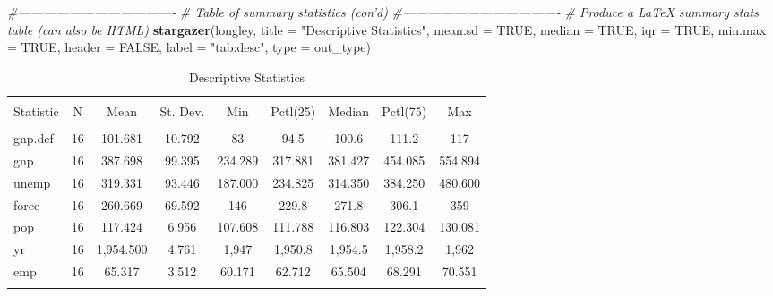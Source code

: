\documentclass[11pt,]{article}
\newenvironment{Shaded}{\begin{snugshade}}{\end{snugshade}}
\newcommand{\KeywordTok}[1]{\textcolor[rgb]{0.13,0.29,0.53}{\textbf{#1}}}
\newcommand{\DataTypeTok}[1]{\textcolor[rgb]{0.13,0.29,0.53}{#1}}
\newcommand{\StringTok}[1]{\textcolor[rgb]{0.31,0.60,0.02}{#1}}
\newcommand{\CommentTok}[1]{\textcolor[rgb]{0.56,0.35,0.01}{\textit{#1}}}
\newcommand{\OtherTok}[1]{\textcolor[rgb]{0.56,0.35,0.01}{#1}}
\newcommand{\NormalTok}[1]{#1}
\begin{document}
\begin{Shaded}
\begin{Highlighting}[]
\CommentTok{#-------------------------------------}
\CommentTok{# Table of summary statistics (con'd)}
\CommentTok{#-------------------------------------}
  \CommentTok{# Produce a LaTeX summary stats table (can also be HTML)}
  \KeywordTok{stargazer}\NormalTok{(longley, }
            \DataTypeTok{title =} \StringTok{"Descriptive Statistics"}\NormalTok{,}
      \DataTypeTok{mean.sd =} \OtherTok{TRUE}\NormalTok{, }\DataTypeTok{median =} \OtherTok{TRUE}\NormalTok{, }\DataTypeTok{iqr =} \OtherTok{TRUE}\NormalTok{, }\DataTypeTok{min.max =} \OtherTok{TRUE}\NormalTok{,}
      \DataTypeTok{header =} \OtherTok{FALSE}\NormalTok{, }\DataTypeTok{label =} \StringTok{"tab:desc"}\NormalTok{, }\DataTypeTok{type =}\NormalTok{ out_type)}
\end{Highlighting}
\end{Shaded}

\begin{table}[!htbp] \centering 
  \caption{Descriptive Statistics} 
  \label{tab:desc} 
\begin{tabular}{@{\extracolsep{5pt}}lcccccccc} 
\\[-1.8ex]\hline 
\hline \\[-1.8ex] 
Statistic & \multicolumn{1}{c}{N} & \multicolumn{1}{c}{Mean} & \multicolumn{1}{c}{St. Dev.} & \multicolumn{1}{c}{Min} & \multicolumn{1}{c}{Pctl(25)} & \multicolumn{1}{c}{Median} & \multicolumn{1}{c}{Pctl(75)} & \multicolumn{1}{c}{Max} \\ 
\hline \\[-1.8ex] 
gnp.def & 16 & 101.681 & 10.792 & 83 & 94.5 & 100.6 & 111.2 & 117 \\ 
gnp & 16 & 387.698 & 99.395 & 234.289 & 317.881 & 381.427 & 454.085 & 554.894 \\ 
unemp & 16 & 319.331 & 93.446 & 187.000 & 234.825 & 314.350 & 384.250 & 480.600 \\ 
force & 16 & 260.669 & 69.592 & 146 & 229.8 & 271.8 & 306.1 & 359 \\ 
pop & 16 & 117.424 & 6.956 & 107.608 & 111.788 & 116.803 & 122.304 & 130.081 \\ 
yr & 16 & 1,954.500 & 4.761 & 1,947 & 1,950.8 & 1,954.5 & 1,958.2 & 1,962 \\ 
emp & 16 & 65.317 & 3.512 & 60.171 & 62.712 & 65.504 & 68.291 & 70.551 \\ 
\hline \\[-1.8ex] 
\end{tabular} 
\end{table}
\end{document}
